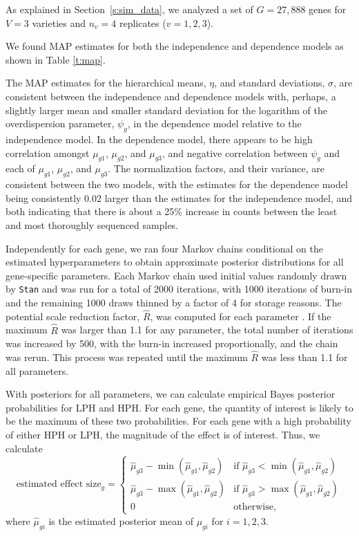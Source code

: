 \documentclass[useAMS,usenatbib,referee]{biom}
\begin{document}
As explained in Section~\ref{s:sim_data}, we analyzed a set of $G=27,888$ genes for $V=3$ varieties and $n_v=4$ replicates ($v=1,2,3$). 

We found MAP estimates for both the independence and dependence models as shown in Table \ref{t:map}. 

The MAP estimates for the hierarchical means, $\eta$, and standard deviations, $\sigma$, are consistent between the independence and dependence models with, perhaps, a slightly larger mean and smaller standard deviation for the logarithm of the overdispersion parameter, $\psi_g$, in the dependence model relative to the independence model. In the dependence model, there appears to be high correlation amongst $\mu_{g1}$, $\mu_{g2}$, and $\mu_{g3}$, and negative correlation between $\psi_g$ and each of $\mu_{g1}$, $\mu_{g2}$, and $\mu_{g3}$. The normalization factors, and their variance, are consistent between the two models, with the estimates for the dependence model being consistently 0.02 larger than the estimates for the independence model, and both indicating that there is about a 25\% increase in counts between the least and most thoroughly sequenced samples. 


Independently for each gene, we ran four Markov chains conditional on the estimated hyperparameters to obtain approximate posterior distributions for all gene-specific parameters. Each Markov chain used initial values randomly drawn by {\tt Stan} and was run for a total of 2000 iterations, with 1000 iterations of burn-in and the remaining 1000 draws thinned by a factor of 4 for storage reasons. 
The potential scale reduction factor, $\hat{R}$, was computed for each parameter \citep{Gelm:Rubi:infe:1992, Broo:Gelm:gene:1997}. If the maximum $\hat{R}$ was larger than 1.1 for any parameter, the total number of iterations was increased by 500, with the burn-in increased proportionally, and the chain was rerun. This process was repeated until the maximum $\hat{R}$ was less than 1.1 for all parameters.

With posteriors for all parameters, we can calculate empirical Bayes posterior probabilities for LPH and HPH. For each gene, the quantity of interest is likely to be the maximum of these two probabilities. For each gene with a high probability of either HPH or LPH, the magnitude of the effect is of interest. Thus, we calculate 
\begin{equation}
\mbox{estimated effect size}_g = \left\{ 
\begin{array}{ll}
\hat{\mu}_{g3} - \min(\hat{\mu}_{g1},\hat{\mu}_{g2}) & \mbox{if } \hat{\mu}_{g3} < \min(\hat{\mu}_{g1},\hat{\mu}_{g2}) \\
\hat{\mu}_{g3} - \max(\hat{\mu}_{g1},\hat{\mu}_{g2}) & \mbox{if } \hat{\mu}_{g3} > \max(\hat{\mu}_{g1},\hat{\mu}_{g2}) \\
0 & \mbox{otherwise},
\end{array} 
\right. 
\label{e:effect_size}
\end{equation}
where $\hat{\mu}_{gi}$ is the estimated posterior mean of $\mu_{gi}$ for $i=1,2,3$.
\end{document}
